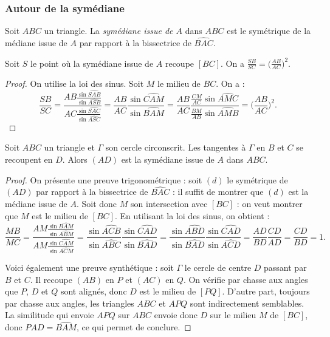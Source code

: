 \subsubsection*{Autour de la symédiane}

\begin{defn}
Soit $ABC$ un triangle. La \textit{symédiane issue de $A$} dans $ABC$ est le symétrique de la médiane issue de $A$ par rapport à la bissectrice de $\widehat{BAC}$.
\end{defn}

\begin{lem}
Soit $S$ le point où la symédiane issue de $A$ recoupe $[BC]$. On a $\frac{SB}{SC}=\Big( \frac{AB}{AC} \Big)^2$.
\end{lem}

\begin{proof}
On utilise la loi des sinus. Soit $M$ le milieu de $BC$. On a :
\[\frac{SB}{SC}=\frac{AB \frac{\sin \widehat{SAB}}{\sin \widehat{ASB}}}{AC \frac{\sin \widehat{SAC}}{\sin \widehat{ASC}}}=\frac{AB}{AC} \frac{\sin \widehat{CAM}}{\sin \widehat{BAM}}=\frac{AB}{AC} \frac{\frac{CM}{AC} \sin \widehat{AMC}}{\frac{BM}{AB} \sin \widehat{AMB}}=\Big( \frac{AB}{AC} \Big)^2.\]
\end{proof}

\begin{lem}
Soit $ABC$ un triangle et $\Gamma$ son cercle circonscrit. Les tangentes à $\Gamma$ en $B$ et $C$ se recoupent en $D$. Alors $(AD)$ est la symédiane issue de $A$ dans $ABC$.
\end{lem}

\begin{proof}
On présente une preuve trigonométrique : soit $(d)$ le symétrique de $(AD)$ par rapport à la bissectrice de $\widehat{BAC}$ : il suffit de montrer que $(d)$ est la médiane issue de $A$. Soit donc $M$ son intersection avec $[BC]$ : on veut montrer que $M$ est le milieu de $[BC]$. En utilisant la loi des sinus, on obtient :
\[\frac{MB}{MC}=\frac{AM \frac{\sin \widehat{BAM}}{\sin \widehat{ABM}}}{AM \frac{\sin \widehat{CAM}}{\sin \widehat{ACM}}}=\frac{\sin \widehat{ACB}}{\sin \widehat{ABC}} \frac{\sin \widehat{CAD}}{\sin \widehat{BAD}}=\frac{\sin \widehat{ABD}}{\sin \widehat{BAD}} \frac{\sin \widehat{CAD}}{\sin \widehat{ACD}}=\frac{AD}{BD} \frac{CD}{AD}=\frac{CD}{BD}=1.\]

Voici également une preuve synthétique : soit $\Gamma$ le cercle de centre $D$ passant par $B$ et $C$. Il recoupe $(AB)$ en $P$ et $(AC)$ en $Q$. On vérifie par chasse aux angles que $P$, $D$ et $Q$ sont alignés, donc $D$ est le milieu de $[PQ]$. D'autre part, toujours par chasse aux angles, les triangles $ABC$ et $APQ$ sont indirectement semblables. La similitude qui envoie $APQ$ sur $ABC$ envoie donc $D$ sur le milieu $M$ de $[BC]$, donc $\widehat{PAD}=\widehat{BAM}$, ce qui permet de conclure.
\end{proof}

